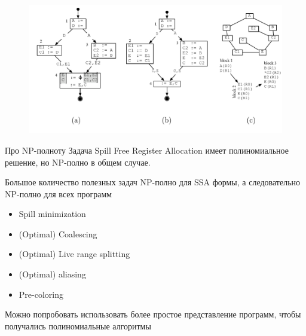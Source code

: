 \documentclass[aspectratio=169
  , xcolor={svgnames}
  , hyperref={ colorlinks,citecolor=DeepPink4
             , linkcolor=DarkRed,urlcolor=DarkBlue}
  , russian
  ]{beamer}
\theoremstyle{exerciseStyle1}
\begin{document}
\begin{frame}[fragile]%
\begin{figure}
\centering
\includegraphics[width=\textwidth]{figures/regalloc-ssa}
\caption{}
\label{fig:regalloc-ssa}
\end{figure}
\end{frame}


\begin{frame}[fragile]{Про NP-полноту}
Задача Spill Free Register Allocation имеет полиномиальное решение, но NP-полно в общем случае.

Большое количество полезных задач NP-полно для SSA формы, а следовательно NP-полно для всех программ
\begin{itemize}
\item Spill minimization
\item (Optimal) Coalescing
\item (Optimal) Live range splitting 
\item (Optimal) aliasing
\item Pre-coloring
\end{itemize}
Можно попробовать использовать более простое представление программ, чтобы получались полиномиальные алгоритмы
\end{frame}
\end{document}
